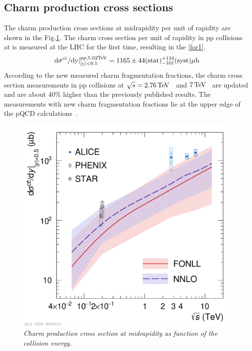 \subsection{Charm production cross sections}
The charm production cross sections at midrapidity per unit of rapidity are shown in the Fig.\ref{ccbar}.
The charm cross section per unit of rapidity in pp collisions at \tevf is measured at the LHC for the first time, resulting in the \ref{for1}.
\begin{equation}
    {{\rm d\sigma^{\rm c\bar c}}/{\rm dy|^{\rm pp, 5.02 TeV}_{|y|<0.5}} = 1165 \pm 44(\rm stat)^{+134}_{-101}(\rm syst) \mu \rm b}
    \label{for1}
\end{equation}
According to the new measured charm fragmentation fractions, the charm cross section measurements in pp collisions at $\sqrt{s} = 2.76\,\rm TeV$~\cite{Abelev_2012} and $7 \,\rm TeV$~\cite{Acharya_2017} are updated and are about 40\% higher than the previously published results.
The measurements with new charm fragmentation fractions lie at the upper edge of the pQCD calculations~\cite{Cacciari:1998it,PhysRevLett.118.122001}.
\begin{figure}[ht!]
    \centering
    \includegraphics[width=.85\textwidth]{fig/cc_Vs_energy.pdf}
    \caption{\it Charm production cross section at midrapidity as function of the collision energy.}
    \label{ccbar}
\end{figure}